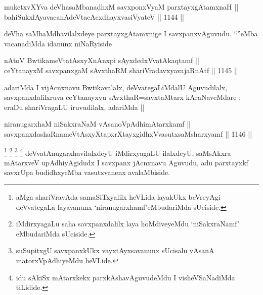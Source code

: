 
\begin{shl}
muketxvXYva deVhasaMbanadhxM savxponxV\s yaM parxtayxgAtamxnaH || \\
bahiSukxlAyavacanAdeVtacAcxdhayxvasiVyateV ||  1144 ||  
\end{shl}

\begin{artha}
deVha saMbaMdhavilalxdeye parxtayxgAtamxnige I savxpanxvAguvudu. ``\stext''eMba vacanadiMda idanunx niNaRyiside
\end{artha}


\begin{shl}
nAtoV BwtikameVtatAsxyXnAnxpi sAyxdedxVvatAkaqtamf || \\
ceYtanayxM savxpanxgaM sAvxthaRM shariVradavxyavajaRnAtf ||  1145 ||  
\end{shl}

\begin{artha}
adariMda I vijAcnxnavu Bwtikavalalx, deVvategaLiMdalU Aguvudilalx, savxpanxdalilxruva ceYtanayxvu sAvxthaR=savxtaMtarx kAraNaveMdare : eraDu shariVragaLU iruvudilalx, adariMda ||
\end{artha}

\begin{shl}
niranugarxhaM niSakxraNaM vAsanoVpAdhimAtarxkamf || \\
savxpanxdashaRnameVtAsxyXtapxrXtayxgidhxVvasutxsaMsharxyamf ||  1146 ||  
\end{shl}

\begin{artha}
\footnote{aMga shariVravAda samaSiTxyalilx heVLida layakUkx beVreyAgi deVvategaLa layavanunx `niranugarxhamf'eMbudariMda sUciside.}
\footnote{iMdirxyagaLu saha savxpanxdalilx laya hoMdiveyeMdu `niSakxraNamf' eMbudariMda sUciside.}
\footnote{suSupitxgU savxpanxkUkx vayxtAyxsavanunx sUcisalu vAsanA matorxVpAdhiyeMdu heVLide.}
\footnote{idu sAkiSx mAtarxkekx parxkAshavAguvudeMdu I visheVSaNadiMda tiLidide.}
deVvatAnugarxhavilalxdeyU iMdirxyagaLU ilalxdeyU, saMsAkxra mAtarxveV upAdhiyAgidudx I savxpanx jAcnxnavu Aguvudu, adu parxtayxkf savxrUpa budidhxyeMba vasutxvanenx avalaMbiside.
\end{artha}


